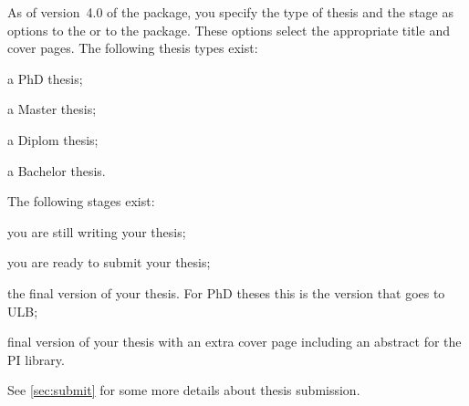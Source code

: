 As of version~4.0 of the package, you specify the type of thesis and the stage as options
to the  or to the  package.
These options select the appropriate title and cover pages.
The following thesis types exist:
\begin{description}\setlength{\parskip}{0pt}\setlength{\itemsep}{0pt}
\item[PhD] a PhD thesis;
\item[Master] a Master thesis;
\item[Diplom] a Diplom thesis;
\item[Bachelor] a Bachelor thesis.
\end{description}
The following stages exist:
\begin{description}\setlength{\parskip}{0pt}\setlength{\itemsep}{0pt}
\item[Draft] you are still writing your thesis;
\item[Submit] you are ready to submit your thesis;
\item[Final] the final version of your thesis.
  For PhD theses this is the version that goes to ULB\@;
\item[PILibrary] final version of your thesis with an extra cover page
  including an abstract for the PI library.
\end{description}
%
See \cref{sec:submit} for some more details about thesis submission.

